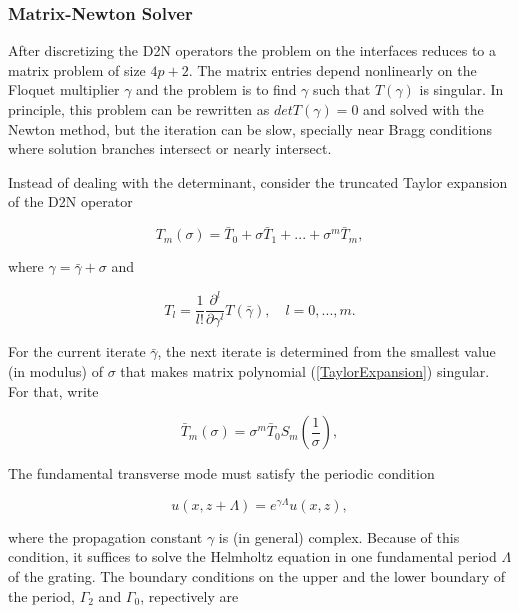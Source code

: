 \subsubsection{Matrix-Newton Solver}
After discretizing the D2N operators the problem on the interfaces
reduces to a matrix problem of size $4p+2$. The matrix entries depend
nonlinearly on the Floquet multiplier $\gamma$ and the problem is to 
find $\gamma$ such that $T(\gamma)$ is singular. In principle, this 
problem can be rewritten as $det T(\gamma) = 0$ and solved with the
Newton method, but the iteration can be slow, specially near Bragg
conditions where solution branches intersect or nearly intersect.

Instead of dealing with the determinant, consider the truncated Taylor
expansion of the D2N operator

\begin{equation}
T_m(\sigma) = \bar{T}_0 + \sigma \bar{T}_1 + ... + \sigma^m \bar{T}_m,
\label{TaylorExpansion}
\end{equation}

where $\gamma = \bar{\gamma} + \sigma$ and

\begin{equation}
T_l = \frac{1}{l!} \frac{\partial^l}{\partial{\gamma^l}} T(\bar{\gamma}),
\quad l = 0, ...,m.
\end{equation}

For the current iterate $\bar{\gamma}$, the next iterate is determined
from the smallest value (in modulus) of $\sigma$ that makes matrix
polynomial (\ref{TaylorExpansion}) singular. For that, write

\begin{equation}
\bar{T}_m(\sigma) = \sigma^m \bar{T}_0 S_m (\frac{1}{\sigma}),
\end{equation}






The fundamental transverse mode must satisfy the periodic condition

\begin{equation}
u(x,z + \Lambda) = e^{\gamma \Lambda} u(x,z),
\end{equation}

where the propagation constant $\gamma$ is (in general)
complex. Because of this condition, it suffices to solve the Helmholtz
equation in one fundamental period $\Lambda$ of the grating. The
boundary conditions on the upper and the lower boundary of the period,
$\Gamma_2$ and $\Gamma_0$, repectively are

